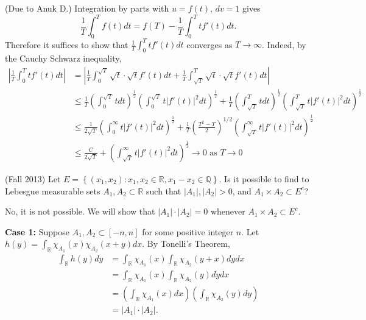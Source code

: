 \documentclass{exam}
\theoremstyle{problemstyle}
\newcommand{\1}[1]{\textbf{1}_{\left[#1\right]}} %
\def\R{\mathbb{R}} %
\def\Q{\mathbb{Q}} %
\begin{document}
\begin{questions}
\begin{solution}
(Due to Anuk D.) Integration by parts with $u=f(t)$, $dv=1$ gives
\begin{equation*}
  \frac{1}{T}\int_{0}^{T}f(t)dt = f(T) - \frac{1}{T}\int_{0}^{T}tf'(t)dt.
\end{equation*}
Therefore it suffices to show that $\frac{1}{T}\int_{0}^{T}tf'(t)dt$ converges as $T\to \infty$. Indeed, by the Cauchy Schwarz inequality,
\begin{align*}
  \left|\frac{1}{T}\int_{0}^{T}tf'(t)dt\right|
  &= \left|\frac{1}{T}\int_{0}^{\sqrt{T}}\sqrt{t}\cdot\sqrt{t}f'(t)dt + \frac{1}{T}\int_{\sqrt{T}}^{T}\sqrt{t}\cdot \sqrt{t}f'(t)dt\right|\\
  & \leq \frac{1}{T}\left(\int_{0}^{\sqrt{T}}t dt \right)^{\frac{1}{2}}\left( \int_{0}^{\sqrt{T}}t |f'(t)|^{2}dt \right)^{\frac{1}{2}}+ \frac{1}{T}\left( \int_{\sqrt{T}}^{T}tdt \right)^{\frac{1}{2}}\left( \int_{\sqrt{T}}^{T}t|f'(t)|^{2}dt \right)^{\frac{1}{2}}\\
  &\leq \frac{1}{2 \sqrt{T}} \left(\int_{0}^{\infty}t|f'(t)|^{2} dt \right)^{\frac{1}{2}} + \frac{1}{T}\left( \frac{T^{2}-T}{2} \right)^{1/2}\left(\int_{\sqrt{T}}^{\infty}t|f'(t)|^{2}dt \right)^{\frac{1}{2}}\\
  &\leq \frac{C}{2 \sqrt{T}}  +\left(\int_{\sqrt{T}}^{\infty} t|f'(t)|^{2}dt \right)^{\frac{1}{2}} \to 0 \text{ as }T\to 0
\end{align*}
\end{solution}



\question (Fall 2013) Let $E= \left\{ (x_{1},x_{2}) : x_{1},x_{2}\in \R, x_{1}-x_{2}\in \Q\right\}$. Is it possible to find to Lebesgue measurable sets $A_{1},A_{2}\subset\R$ such that $|A_{1}|,|A_{2}|>0$, and $A_{1}\times A_{2}\subset E^{c}$?
\begin{solution}
  No, it is not possible. We will show that $|A_{1}|\cdot|A_{2}| = 0$ whenever $A_{1}\times A_{2}\subset E^{c}$. 

 \textbf{ Case 1:} Suppose $A_{1},A_{2}\subset [-n,n]$ for some positive integer $n$.
  Let $h(y)= \int_{\R}\chi_{A_{1}}(x)\chi_{A_{2}}(x+y)dx$. By Tonelli's Theorem,
  \begin{align*}
    \int_{\R}h(y)dy
    &=\int_{\R} \chi_{A_{1}}(x) \int_{\R} \chi_{A_{2}}(y+x)dy dx\\
    &=\int_{\R} \chi_{A_{1}}(x) \int_{\R} \chi_{A_{2}}(y)dy dx\\
    &=\left(\int_{\R} \chi_{A_{1}}(x)dx\right)\left( \int_{\R} \chi_{A_{2}}(y)dy\right)\\
    &=|A_{1}|\cdot |A_{2}|.
  \end{align*}


\end{solution}
\end{questions}
\end{document}
